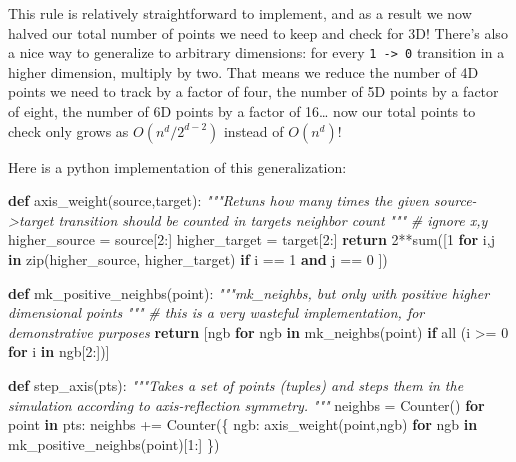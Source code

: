 \documentclass[]{article}
\newenvironment{Shaded}{}{}
\newcommand{\BuiltInTok}[1]{#1}
\newcommand{\CommentTok}[1]{\textcolor[rgb]{0.38,0.63,0.69}{\textit{#1}}}
\newcommand{\ControlFlowTok}[1]{\textcolor[rgb]{0.00,0.44,0.13}{\textbf{#1}}}
\newcommand{\DecValTok}[1]{\textcolor[rgb]{0.25,0.63,0.44}{#1}}
\newcommand{\KeywordTok}[1]{\textcolor[rgb]{0.00,0.44,0.13}{\textbf{#1}}}
\newcommand{\NormalTok}[1]{#1}
\newcommand{\OperatorTok}[1]{\textcolor[rgb]{0.40,0.40,0.40}{#1}}
\begin{document}
This rule is relatively straightforward to implement, and as a result we now
halved our total number of points we need to keep and check for 3D! There's also
a nice way to generalize to arbitrary dimensions: for every
\texttt{1\ -\textgreater{}\ 0} transition in a higher dimension, multiply by
two. That means we reduce the number of 4D points we need to track by a factor
of four, the number of 5D points by a factor of eight, the number of 6D points
by a factor of 16\ldots{} now our total points to check only grows as
\(O(n^d / 2^{d-2})\) instead of \(O(n^d)\)!

Here is a python implementation of this generalization:

\begin{Shaded}
\begin{Highlighting}[]
\KeywordTok{def}\NormalTok{ axis\_weight(source,target):}
    \CommentTok{"""Retuns how many times the given source{-}>target transition should be}
\CommentTok{    counted in target\textquotesingle{}s neighbor count}
\CommentTok{    """}
    \CommentTok{\# ignore x,y}
\NormalTok{    higher\_source }\OperatorTok{=}\NormalTok{ source[}\DecValTok{2}\NormalTok{:]}
\NormalTok{    higher\_target }\OperatorTok{=}\NormalTok{ target[}\DecValTok{2}\NormalTok{:]}
    \ControlFlowTok{return} \DecValTok{2}\OperatorTok{**}\BuiltInTok{sum}\NormalTok{([}\DecValTok{1} \ControlFlowTok{for}\NormalTok{ i,j }\KeywordTok{in} \BuiltInTok{zip}\NormalTok{(higher\_source, higher\_target)}
                      \ControlFlowTok{if}\NormalTok{ i }\OperatorTok{==} \DecValTok{1} \KeywordTok{and}\NormalTok{ j }\OperatorTok{==} \DecValTok{0}
\NormalTok{                  ])}

\KeywordTok{def}\NormalTok{ mk\_positive\_neighbs(point):}
    \CommentTok{"""mk\_neighbs, but only with positive higher dimensional points}
\CommentTok{    """}
    \CommentTok{\# this is a very wasteful implementation, for demonstrative purposes}
    \ControlFlowTok{return}\NormalTok{ [ngb }\ControlFlowTok{for}\NormalTok{ ngb }\KeywordTok{in}\NormalTok{ mk\_neighbs(point) }\ControlFlowTok{if} \BuiltInTok{all}\NormalTok{ (i }\OperatorTok{>=} \DecValTok{0} \ControlFlowTok{for}\NormalTok{ i }\KeywordTok{in}\NormalTok{ ngb[}\DecValTok{2}\NormalTok{:])]}

\KeywordTok{def}\NormalTok{ step\_axis(pts):}
    \CommentTok{"""Takes a set of points (tuples) and steps them in the simulation}
\CommentTok{    according to axis{-}reflection symmetry.}
\CommentTok{    """}
\NormalTok{    neighbs }\OperatorTok{=}\NormalTok{ Counter()}
    \ControlFlowTok{for}\NormalTok{ point }\KeywordTok{in}\NormalTok{ pts:}
\NormalTok{        neighbs }\OperatorTok{+=}\NormalTok{ Counter(\{ ngb: axis\_weight(point,ngb)}
                               \ControlFlowTok{for}\NormalTok{ ngb }\KeywordTok{in}\NormalTok{ mk\_positive\_neighbs(point)[}\DecValTok{1}\NormalTok{:]}
\NormalTok{                           \})}


\end{Highlighting}
\end{Shaded}
\end{document}
